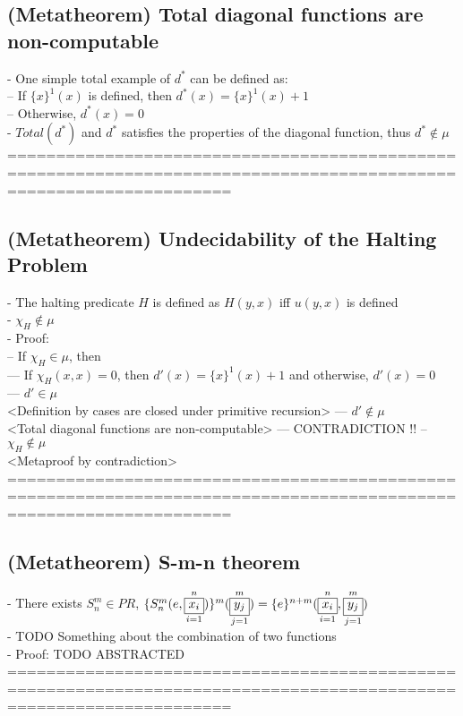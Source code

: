 \documentclass{book}
\newcommand{\inot}{\not}
\newcommand{\vdc}[3]{\underset{#2}{\overset{#3}{\fbox{$#1$}}}}
\begin{document}
\subsection{(Metatheorem) Total diagonal functions are non-computable} %
	- One simple total example of $d^*$ can be defined as: \\
		-- If $\{x\}^1(x)$ is defined, then $d^*(x) = \{x\}^1(x) + 1$ \\
		-- Otherwise, $d^*(x) = 0$ \\
	- $Total(d^*)$ and $d^*$ satisfies the properties of the diagonal function, thus $d^* \inot \in \mu$ \\
	===================================================================================================================
\subsection{(Metatheorem) Undecidability of the Halting Problem} %
	- The halting predicate $H$ is defined as $H(y, x)$ iff $u(y, x)$ is defined \\
	- $\chi_H \inot \in \mu$ \\
	- Proof: \\
		-- If $\chi_H \in \mu$, then \\
			--- If $\chi_H(x, x) = 0$, then $d'(x) = \{x\}^1(x) + 1$ and otherwise, $d'(x) = 0$ \\
			--- $d' \in \mu$ \\ <Definition by cases are closed under primitive recursion>
			--- $d' \inot \in \mu$ \\ <Total diagonal functions are non-computable>
			--- CONTRADICTION !!
		-- $\chi_H \inot \in \mu$ \\ <Metaproof by contradiction>
	===================================================================================================================
\subsection{(Metatheorem) S-m-n theorem} %
	- There exists $S^m_n \in PR$, $\{S^m_n(e, \vdc{x_i}{i=1}{n})\}^m(\vdc{y_j}{j=1}{m}) = \{e\}^{n+m}(\vdc{x_i}{i=1}{n}, \vdc{y_j}{j=1}{m})$ \\
	- TODO Something about the combination of two functions \\
	- Proof: TODO ABSTRACTED \\
	===================================================================================================================
\end{document}
